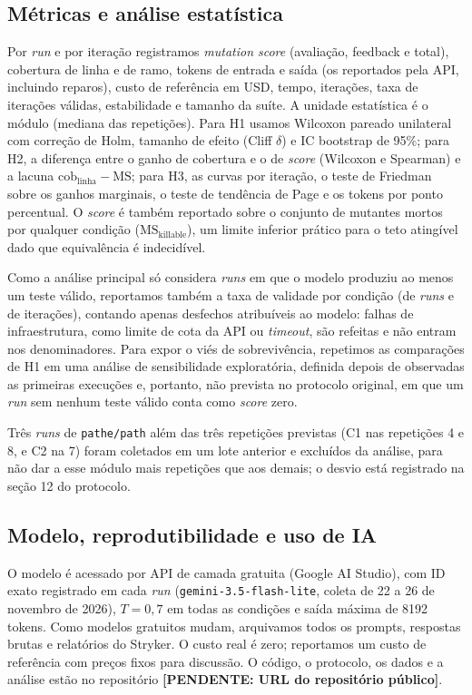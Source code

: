 \documentclass[12pt]{article}
\newcommand{\pendente}[1]{{\color{red}\textbf{[PENDENTE: #1]}}}
\begin{document}
\subsection{Métricas e análise estatística}

Por \textit{run} e por iteração registramos \textit{mutation score} (avaliação, feedback e total), cobertura de linha e de ramo,
tokens de entrada e saída (os reportados pela API, incluindo reparos), custo de referência em USD, tempo, iterações,
taxa de iterações válidas, estabilidade e tamanho da suíte. A unidade estatística é o módulo (mediana das repetições).
Para H1 usamos Wilcoxon pareado unilateral com correção de Holm, tamanho de efeito (Cliff $\delta$) e IC bootstrap de
95\%; para H2, a diferença entre o ganho de cobertura e o de \textit{score} (Wilcoxon e Spearman) e a lacuna
$\text{cob}_{\text{linha}}-\text{MS}$; para H3, as curvas por iteração, o teste de Friedman sobre os ganhos marginais, o teste de
tendência de Page e os tokens por ponto percentual. O \textit{score} é também reportado sobre o conjunto de mutantes
mortos por qualquer condição ($\text{MS}_{\text{killable}}$), um limite inferior prático para o teto atingível dado que
equivalência é indecidível.

Como a análise principal só considera \textit{runs} em que o modelo produziu ao menos um teste válido, reportamos
também a taxa de validade por condição (de \textit{runs} e de iterações), contando apenas desfechos atribuíveis ao modelo:
falhas de infraestrutura, como limite de cota da API ou \textit{timeout}, são refeitas e não entram nos denominadores.
Para expor o viés de sobrevivência, repetimos as comparações de H1 em uma análise de sensibilidade exploratória, definida
depois de observadas as primeiras execuções e, portanto, não prevista no protocolo original, em que um \textit{run} sem
nenhum teste válido conta como \textit{score} zero.

Três \textit{runs} de \texttt{pathe/path} além das três repetições previstas (C1 nas repetições 4 e 8, e C2 na 7) foram
coletados em um lote anterior e excluídos da análise, para não dar a esse módulo mais repetições que aos demais; o
desvio está registrado na seção 12 do protocolo.

\subsection{Modelo, reprodutibilidade e uso de IA}

O modelo é acessado por API de camada gratuita (Google AI Studio), com ID exato registrado em cada \textit{run}
(\texttt{gemini-3.5-flash-lite}, coleta de 22 a 26 de novembro de 2026), $T=0{,}7$ em todas as condições e saída máxima de 8192 tokens. Como modelos
gratuitos mudam, arquivamos todos os prompts, respostas brutas e relatórios do Stryker. O custo real é zero; reportamos
um custo de referência com preços fixos para discussão. O código, o protocolo, os dados e a análise estão no repositório
\pendente{URL do repositório público}.
\end{document}
